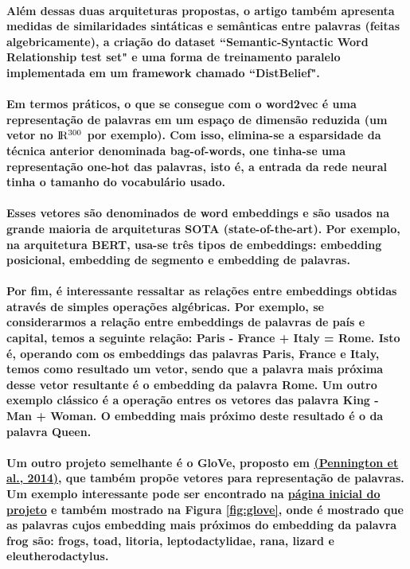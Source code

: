 \documentclass[a4paper]{article}    %
\begin{document}
\paragraph{Além dessas duas arquiteturas propostas, o artigo também apresenta medidas de similaridades sintáticas e semânticas entre palavras (feitas algebricamente), a criação do dataset ``Semantic-Syntactic Word Relationship test set" e uma forma de treinamento paralelo implementada em um framework chamado “DistBelief".}

\paragraph{Em termos práticos, o que se consegue com o word2vec é uma representação de palavras em um espaço de dimensão reduzida (um vetor no ${\rm I\!R^{300}}$ por exemplo). Com isso, elimina-se a esparsidade da técnica anterior denominada bag-of-words, one tinha-se uma representação one-hot das palavras, isto é, a entrada da rede neural tinha o tamanho do vocabulário usado.}

\paragraph{Esses vetores são denominados de word embeddings e são usados na grande maioria de arquiteturas SOTA (state-of-the-art). Por exemplo, na arquitetura BERT, usa-se três tipos de embeddings: embedding posicional, embedding de segmento e embedding de palavras.}

\paragraph{Por fim, é interessante ressaltar as relações entre embeddings obtidas através de simples operações algébricas. Por exemplo, se considerarmos a relação entre embeddings de palavras de país e capital, temos a seguinte relação: Paris - France + Italy = Rome. Isto é, operando com os embeddings das palavras Paris, France e Italy, temos como resultado um vetor, sendo que a palavra mais próxima desse vetor resultante é o embedding da palavra Rome. Um outro exemplo clássico é a operação entres os vetores das palavra King - Man + Woman. O embedding mais próximo deste resultado é o da palavra Queen.}

\paragraph{Um outro projeto semelhante é o GloVe, proposto em \href{https://github.com/ito-rafael/machine-learning/blob/master/papers/NLP/2014\%20-\%20\%5BGloVe\%5D\%20GloVe:\%20Global\%20Vectors\%20for\%20Word\%20Representation\%20\%5BStanford\%20University\%5D\%20(Pennington\%20et\%20al.\%2C\%202014).pdf}{(Pennington et al., 2014)}, que também propõe vetores para representação de palavras. Um exemplo interessante pode ser encontrado na \href{https://nlp.stanford.edu/projects/glove/}{página inicial do projeto} e também mostrado na Figura \ref{fig:glove}, onde é mostrado que as palavras cujos embedding mais próximos do embedding da palavra frog são: frogs, toad, litoria, leptodactylidae, rana, lizard e eleutherodactylus.}
\end{document}
